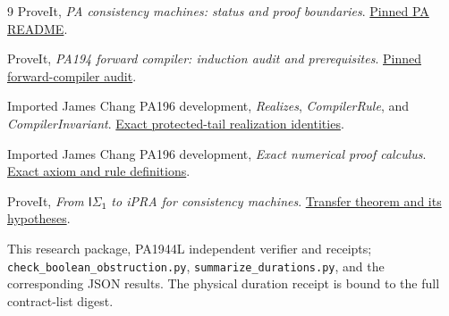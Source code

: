 \documentclass[11pt]{article}
\newcommand{\isone}{\mathsf{I\Sigma_1}}
\begin{document}
\begin{thebibliography}{9}
ProveIt, \emph{PA consistency machines: status and proof boundaries}.
\href{https://github.com/VladimirReshetnikov/ProveIt/blob/1c9524d8bf2e0a27b9a16ff622359927f536e663/Computability/BusyBeaver/Research/PA/README.md}{Pinned PA README}.

ProveIt, \emph{PA194 forward compiler: induction audit and prerequisites}.
\href{https://github.com/VladimirReshetnikov/ProveIt/blob/1c9524d8bf2e0a27b9a16ff622359927f536e663/Computability/BusyBeaver/Research/PA/pa194-forward-audit/README.md}{Pinned forward-compiler audit}.

Imported James Chang PA196 development,
\emph{Realizes}, \emph{CompilerRule}, and \emph{CompilerInvariant}.
\href{https://github.com/VladimirReshetnikov/ProveIt/blob/1c9524d8bf2e0a27b9a16ff622359927f536e663/Computability/BusyBeaver/Research/PA/jamesyc-upstream/pa196/PA196/Arithmetic/Realizes.lean}{Exact protected-tail realization identities}.

Imported James Chang PA196 development, \emph{Exact numerical proof calculus}.
\href{https://github.com/VladimirReshetnikov/ProveIt/blob/1c9524d8bf2e0a27b9a16ff622359927f536e663/Computability/BusyBeaver/Research/PA/jamesyc-upstream/pa196/PA196/Logic/Basic.lean}{Exact axiom and rule definitions}.

ProveIt, \emph{From $\isone$ to iPRA for consistency machines}.
\href{https://github.com/VladimirReshetnikov/ProveIt/blob/1c9524d8bf2e0a27b9a16ff622359927f536e663/Computability/BusyBeaver/Research/PA/isigma1-transfer/README.md}{Transfer theorem and its hypotheses}.

This research package, PA1944L independent verifier and receipts;
\texttt{check\_boolean\_obstruction.py},
\texttt{summarize\_durations.py}, and the corresponding JSON results.
The physical duration receipt is bound to the full contract-list digest.
\end{thebibliography}
\end{document}
